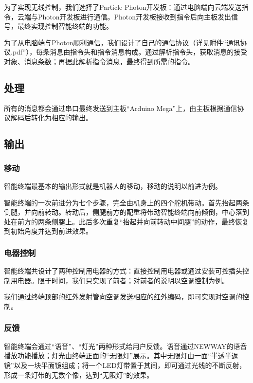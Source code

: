     \hspace{1.5em}为了实现无线控制，我们选择了Particle Photon开发板：通过电脑端向云端发送指令，云端与Photon开发板进行通信。Photon开发板接收到指令后向主板发出信号，最终实现控制智能终端的功能。

    \hspace{1.5em}为了从电脑端与Photon顺利通信，我们设计了自己的通信协议（详见附件“通讯协议.pdf”），每条消息由指令头和指令消息构成。通过解析指令头，获取消息的接受对象、消息条数；再据此解析指令消息，最终得到所需的指令。%

    \subsection{处理}
    \hspace{1.5em}所有的消息都会通过串口最终发送到主板“Arduino Mega”上，由主板根据通信协议解码后转化为相应的输出。

    \subsection{输出}
    \subsubsection{移动}
    \hspace{1.5em}智能终端最基本的输出形式就是机器人的移动，移动的说明以前进为例。
    
    \hspace{1.5em}智能终端的一次前进分为七个步骤，完全由机身上的四个舵机带动。首先抬起两条侧腿，并向前转动。转动后，侧腿前方的配重将带动智能终端向前倾倒，中心落到处在前方的两条侧腿上。此后多次重复“抬起并向前转动中间腿”的动作，最终恢复到初始角度并达到前进效果。

    \subsubsection{电器控制}
    \hspace{1.5em}智能终端共设计了两种控制用电器的方式：直接控制用电器或通过安装可控插头控制用电器。限于时间，我们只实现了前者；对前者的说明以空调控制为例。

    \hspace{1.5em}我们通过终端顶部的红外发射管向空调发送相应的红外编码，即可实现对空调的控制。

    \subsubsection{反馈}
    \hspace{1.5em}智能终端会通过“语音”、“灯光”两种形式给用户反馈。语音通过NEWWAY的语音播放功能播放；灯光由终端正面的“无限灯”展示。其中无限灯由一面“半透半返镜”以及一块平面镜组成；将一个LED灯带置于其间，即可通过光线的不断反射，形成一条灯带的无数个像，达到“无限灯”的效果。
    
